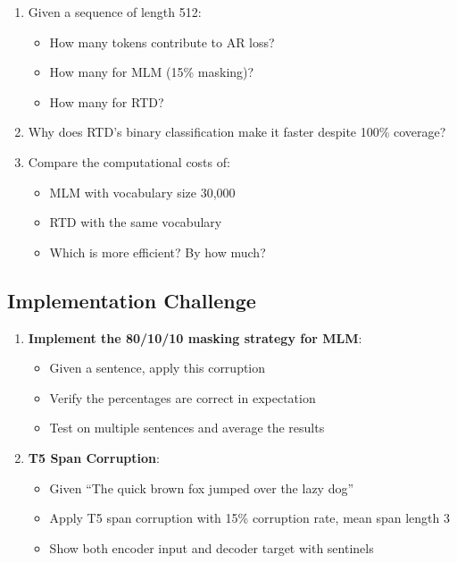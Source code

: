 \documentclass{article}
\begin{document}
\begin{enumerate}
\item Given a sequence of length 512:
\begin{itemize}
\item How many tokens contribute to AR loss?
\item How many for MLM (15\% masking)?
\item How many for RTD?
\end{itemize}

\item Why does RTD's binary classification make it faster despite 100\% coverage?

\item Compare the computational costs of:
\begin{itemize}
\item MLM with vocabulary size 30,000
\item RTD with the same vocabulary
\item Which is more efficient? By how much?
\end{itemize}
\end{enumerate}

\subsection{Implementation Challenge}

\begin{enumerate}
\item \textbf{Implement the 80/10/10 masking strategy for MLM}:
\begin{itemize}
\item Given a sentence, apply this corruption
\item Verify the percentages are correct in expectation
\item Test on multiple sentences and average the results
\end{itemize}

\item \textbf{T5 Span Corruption}:
\begin{itemize}
\item Given ``The quick brown fox jumped over the lazy dog''
\item Apply T5 span corruption with 15\% corruption rate, mean span length 3
\item Show both encoder input and decoder target with sentinels
\end{itemize}
\end{enumerate}
\end{document}
